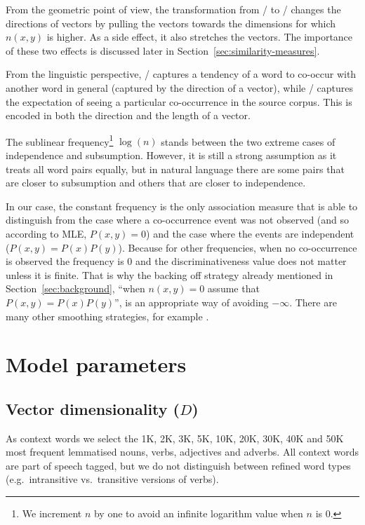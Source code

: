 From the geometric point of view, the transformation from \PMI/ to \NPMI/ changes the directions of vectors by pulling the vectors towards the dimensions for which $n(x, y)$ is higher. As a side effect, it also stretches the vectors. The importance of these two effects is discussed later in Section~\ref{sec:similarity-measures}.

From the linguistic perspective, \PMI/ captures a tendency of a word to co-occur with another word in general (captured by the direction of a vector), while \NPMI/ captures the expectation of seeing a particular co-occurrence in the source corpus. This is encoded in both the direction and the length of a vector.

The sublinear frequency\footnote{We increment $n$ by one to avoid an infinite logarithm value when $n$ is 0.} $\log(n)$ stands between the two extreme cases of independence and subsumption. However, it is still a strong assumption as it treats all word pairs equally, but in natural language there are some pairs that are closer to subsumption and others that are closer to independence.


In our case, the constant frequency is the only association measure that is able to distinguish from the case where a co-occurrence event was not observed (and so according to MLE, $P(x, y)= 0$) and the case where the events are independent ($P(x, y) = P(x)P(y)$). Because for other frequencies, when no co-occurrence is observed the frequency is 0 and the discriminativeness value does not matter unless it is finite. That is why the backing off strategy already mentioned in Section~\ref{sec:background}, ``when $n(x, y) = 0$ assume that $P(x, y) = P(x)P(y)$'', is an appropriate way of avoiding $-\infty$. There are many other smoothing strategies, for example .

\section{Model parameters}
\label{sec:other-model-paramt}

\subsection{Vector dimensionality ($D$)}
\label{sec:vect-dimens}

As context words we select the 1K, 2K, 3K, 5K, 10K, 20K, 30K, 40K and 50K most frequent lemmatised nouns, verbs, adjectives and adverbs. All context words are part of speech tagged, but we do not distinguish between refined word types (e.g.~intransitive vs.~transitive versions of verbs).

